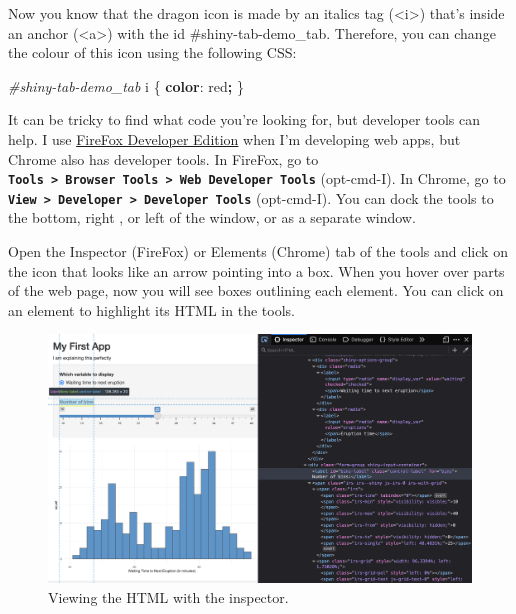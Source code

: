 \documentclass[
  oneside]{book}
\newenvironment{Shaded}{\begin{snugshade}}{\end{snugshade}}
\newcommand{\ConstantTok}[1]{\textcolor[rgb]{0.00,0.00,0.00}{#1}}
\newcommand{\KeywordTok}[1]{\textcolor[rgb]{0.13,0.29,0.53}{\textbf{#1}}}
\newcommand{\NormalTok}[1]{#1}
\newcommand{\OperatorTok}[1]{\textcolor[rgb]{0.81,0.36,0.00}{\textbf{#1}}}
\newcommand{\PreprocessorTok}[1]{\textcolor[rgb]{0.56,0.35,0.01}{\textit{#1}}}
\begin{document}
Now you know that the dragon icon is made by an italics tag (\NormalTok{<i>}) that's inside an anchor (\NormalTok{<a>}) with the \NormalTok{id} \NormalTok{\#shiny-tab-demo\_tab}. Therefore, you can change the colour of this icon using the following CSS:

\begin{Shaded}
\begin{Highlighting}[]
\PreprocessorTok{\#shiny{-}tab{-}demo\_tab}\NormalTok{ i \{ }\KeywordTok{color}\NormalTok{: }\ConstantTok{red}\OperatorTok{;}\NormalTok{ \}}
\end{Highlighting}
\end{Shaded}

It can be tricky to find what code you're looking for, but developer tools can help. I use \href{https://www.mozilla.org/en-US/firefox/developer/}{FireFox Developer Edition} when I'm developing web apps, but Chrome also has developer tools. In FireFox, go to \textbf{\texttt{Tools\ \textgreater{}\ Browser\ Tools\ \textgreater{}\ Web\ Developer\ Tools}} (opt-cmd-I). In Chrome, go to \textbf{\texttt{View\ \textgreater{}\ Developer\ \textgreater{}\ Developer\ Tools}} (opt-cmd-I). You can dock the tools to the bottom, right , or left of the window, or as a separate window.

Open the Inspector (FireFox) or Elements (Chrome) tab of the tools and click on the icon that looks like an arrow pointing into a box. When you hover over parts of the web page, now you will see boxes outlining each element. You can click on an element to highlight its HTML in the tools.

\begin{figure}

{\centering \includegraphics[width=1\linewidth]{images/inspector} 

}

\caption{Viewing the HTML with the inspector.}\label{fig:inspector}
\end{figure}
\end{document}
